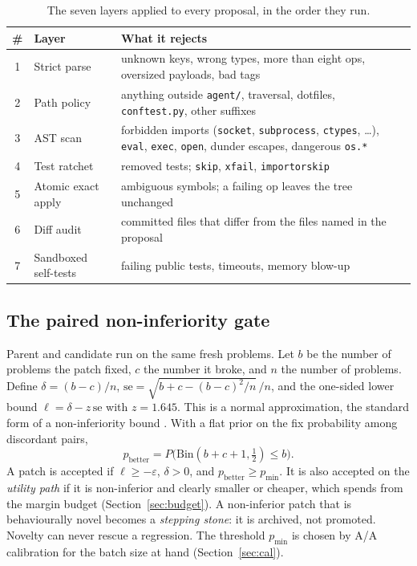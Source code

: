 \documentclass[11pt]{article}
\begin{document}
\begin{table}[t]
\centering\small
\caption{The seven layers applied to every proposal, in the order they run.}
\label{tab:layers}
\begin{tabular}{cp{3.2cm}p{10.3cm}}\toprule
\# & Layer & What it rejects\\\midrule
1 & Strict parse & unknown keys, wrong types, more than eight ops, oversized payloads, bad tags\\
2 & Path policy & anything outside \texttt{agent/}, traversal, dotfiles, \texttt{conftest.py}, other suffixes\\
3 & AST scan & forbidden imports (\texttt{socket}, \texttt{subprocess}, \texttt{ctypes}, \dots), \texttt{eval}, \texttt{exec}, \texttt{open}, dunder escapes, dangerous \texttt{os.*}\\
4 & Test ratchet & removed tests; \texttt{skip}, \texttt{xfail}, \texttt{importorskip}\\
5 & Atomic exact apply & ambiguous symbols; a failing op leaves the tree unchanged\\
6 & Diff audit & committed files that differ from the files named in the proposal\\
7 & Sandboxed self-tests & failing public tests, timeouts, memory blow-up\\\bottomrule
\end{tabular}
\end{table}

\subsection{The paired non-inferiority gate}
\label{sec:gate}

Parent and candidate run on the same fresh problems. Let $b$ be the number of problems the patch fixed, $c$ the number it broke, and $n$ the number of problems. Define
$\delta=(b-c)/n$, $\mathrm{se}=\sqrt{b+c-(b-c)^2/n}\,/n$, and the one-sided lower bound $\ell=\delta-z\,\mathrm{se}$ with $z=1.645$. This is a normal approximation,
the standard form of a non-inferiority bound \citep{blackwelder1982}. With a flat prior on the fix probability among discordant pairs,
\[
p_{\mathrm{better}}=P\big(\mathrm{Bin}(b+c+1,\tfrac12)\le b\big).
\]
A patch is accepted if $\ell\ge-\varepsilon$, $\delta>0$, and $p_{\mathrm{better}}\ge p_{\min}$. It is also accepted on the \emph{utility path} if it is non-inferior and clearly smaller or cheaper, which spends from the margin budget (Section~\ref{sec:budget}).
A non-inferior patch that is behaviourally novel becomes a \emph{stepping stone}: it is archived, not promoted. Novelty can never rescue a regression.
The threshold $p_{\min}$ is chosen by A/A calibration for the batch size at hand (Section~\ref{sec:cal}).
\end{document}
